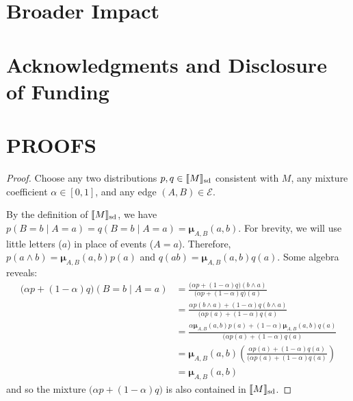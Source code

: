 \documentclass{article}
\theoremstyle{plain}
\theoremstyle{definition}
\theoremstyle{remark}
\DeclarePairedDelimiter{\SD}{\llbracket}{\rrbracket_{\text{sd}}}
\newcommand{\bmu}{\boldsymbol{\mu}}
\newcommand{\Ed}{\mathcal E}
\numberwithin{equation}{section}
\begin{document}
	
	
	\section*{Broader Impact}
	\section*{Acknowledgments and Disclosure of Funding}
	
	\small
	
	
	\onecolumn
	\appendix
	
	\section{PROOFS}
\begin{vfull}
		\thmsetconvex*
		\begin{proof}
			Choose any two distributions $p, q \in \SD{M}$ consistent with $M$, any mixture coefficient $\alpha \in [0,1]$, and any edge $(A,B) \in \Ed$.
			
			By the definition of $\SD{M}$, we have $p(B = b \mid A = a) = q(B = b \mid A = a) = \bmu_{A,B}(a,b)$.  
			For brevity, we will use little letters ($a$) in place of events ($A = a$).
			Therefore, $p(a\land b) = \bmu_{A,B}(a,b) p(a)$ and $q(ab) = \bmu_{A,B}(a,b) q(a)$. Some algebra reveals:
			\begin{align*}
				\Big( \alpha p + (1-\alpha) q \Big) (B = b \mid A = a) &= 
				\frac{\Big( \alpha p + (1-\alpha) q \Big) (b \land a)}{\Big( \alpha p + (1-\alpha) q \Big) (a)} \\
				&= \frac{ \alpha p(b \land a) + (1-\alpha) q(b \land a) }{\Big( \alpha p(a) + (1-\alpha) q (a)} \\
				&= \frac{ \alpha \bmu_{A,B}(a,b) p(a) + (1-\alpha) \bmu_{A,B}(a,b) q(a) }{\Big( \alpha p(a) + (1-\alpha) q (a)} \\
				&=\bmu_{A,B}(a,b) \left(\frac{ \alpha  p(a) + (1-\alpha) q(a) }{\Big( \alpha p(a) + (1-\alpha) q (a)}\right)\\
				&= \bmu_{A,B}(a,b)
			\end{align*}
			and so the mixture $\Big(\alpha p + (1-\alpha) q \Big)$ is also contained in $\SD{M}$.
		\end{proof}
\end{vfull}
	
\end{document}
